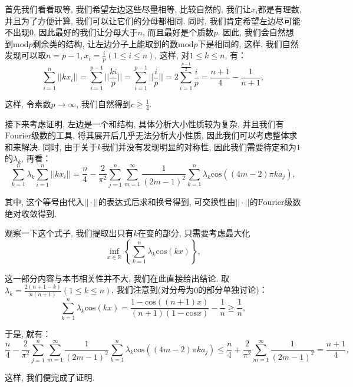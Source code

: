 \documentclass[lang=cn,12pt,thmcnt=section]{elegantbook}
\begin{document}
\begin{analysis}
首先我们看看取等, 我们希望左边这些尽量相等, 比较自然的, 我们让$x_i$都是有理数, 并且为了方便计算, 我们可以让它们的分母都相同. 同时, 我们肯定希望左边尽可能不出现$0$, 因此最好的我们让分母大于$n$, 而且最好是个质数$p$. 因此, 我们会自然想到$\mathrm{mod} p$剩余类的结构, 让左边分子上能取到的数$\mathrm{mod} p$下是相同的, 这样, 我们自然发现可以取$n=p-1,x_i=\frac{i}{p}(1\le i\le n)$, 这样, 对$1\le k\le n$, 有：
\[
\sum_{i=1}^n||kx_i||=\sum_{i=1}^{p-1}||\frac{ki}{p}||=\sum_{i=1}^{p-1}||\frac{i}{p}||=2\sum_{i=1}^{\frac{p-1}{2}}\frac{i}{p}=\frac{n+1}{4}-\frac{1}{n+1},
\]

这样, 令素数$p\to \infty$, 我们自然得到$c\ge \frac{1}{4}$.

接下来考虑证明, 左边是一个和结构, 具体分析大小性质较为复杂, 并且我们有$\mathrm{Fourier}$级数的工具, 将其展开后几乎无法分析大小性质, 因此我们可以考虑整体求和来解决. 同时, 由于关于$k$我们并没有发现明显的对称性, 因此我们需要待定和为$1$的$\lambda_k$, 再看：
\[
\sum_{k=1}^n \lambda_k\sum_{i=1}^n||kx_i||=\frac{n}{4}-\frac{2}{\pi^2}\sum_{j=1}^n\sum_{m=1}^\infty \frac{1}{(2m-1)^2}\sum_{k=1}^n \lambda_k\mathrm{cos}((4m-2)\pi ka_j),
\]

其中, 这个等号由代入$||\cdot||$的表达式后求和换号得到, 可交换性由$||\cdot||$的$\mathrm{Fourier}$级数绝对收敛得到.

观察一下这个式子, 我们提取出只有$k$在变的部分, 只需要考虑最大化
\[
\inf_{x\in \mathbb{R}}\left\{\sum_{k=1}^n \lambda_k\mathrm{cos}(kx)\right\},
\]

这一部分内容与本书相关性并不大, 我们在此直接给出结论. 取$\lambda_k=\frac{2(n+1-k)}{n(n+1)}(1\le k\le n)$, 我们注意到(对分母为$0$的部分单独讨论)：
\[
\sum_{k=1}^n \lambda_k\mathrm{cos}(kx)=\frac{1-\mathrm{cos}((n+1)x)}{(n+1)(1-\mathrm{cos}x)}-\frac{1}{n}\ge \frac{1}{n},
\]

于是, 就有：
\[
\frac{n}{4}-\frac{2}{\pi^2}\sum_{j=1}^n\sum_{m=1}^\infty \frac{1}{(2m-1)^2}\sum_{k=1}^n \lambda_k\mathrm{cos}((4m-2)\pi ka_j)\le \frac{n}{4}+\frac{2}{\pi^2}\sum_{m=1}^\infty \frac{1}{(2m-1)^2}=\frac{n+1}{4},
\]

这样, 我们便完成了证明.
\end{analysis}
\end{document}
